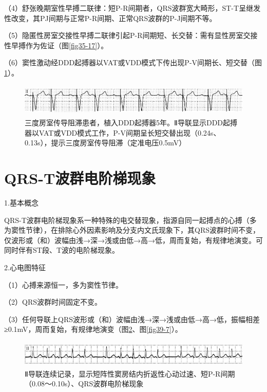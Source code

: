 （4）舒张晚期室性早搏二联律：短P-R间期者，QRS波群宽大畸形，ST-T呈继发性改变，其PJ间期与正常P-R间期、正常QRS波群的P-J间期不等。

（5）隐匿性房室交接性早搏二联律引起P-R间期短、长交替：需有显性房室交接性早搏作为佐证（图\ref{fig35-17}）。

（6）窦性激动经DDD起搏器以VAT或VDD模式下传出现P-V间期长、短交替（图\ref{fig39-5}）。

\begin{figure}[!htbp]
 \centering
 \includegraphics[width=5.58333in,height=0.61458in]{./images/Image00654.jpg}
 \captionsetup{justification=centering}
 \caption{三度房室传导阻滞患者，植入DDD起搏器5年。Ⅱ导联显示DDD起搏器以VAT或VDD模式工作，P-V间期呈长短交替出现（0.24s、0.13s），提示三度房室传导阻滞（定准电压0.5mV）}
 \label{fig39-5}
  \end{figure} 

\protect\hypertarget{text00046.htmlux5cux23subid517}{}{}

\section{QRS-T波群电阶梯现象}

1.基本概念

QRS-T波群电阶梯现象系一种特殊的电交替现象，指源自同一起搏点的心搏（多为窦性节律），在排除心外因素影响及分支内文氏现象下，其QRS波群时间不变，仅波形或（和）波幅由浅→深→浅或由低→高→低，周而复始，有规律地演变。可同时伴有ST段、T波的电阶梯现象。

2.心电图特征

（1）心搏来源恒一，多为窦性节律。

（2）QRS波群时间固定不变。

（3）任何导联上QRS波形或（和）波幅由浅→深→浅或由低→高→低，振幅相差≥0.1mV，周而复始，有规律地演变（图\ref{fig39-6}、图\ref{fig39-7}）。

\begin{figure}[!htbp]
 \centering
 \includegraphics[width=5.60417in,height=0.5in]{./images/Image00655.jpg}
 \captionsetup{justification=centering}
 \caption{Ⅱ导联连续记录，显示短阵性窦房结内折返性心动过速、短P-R间期（0.08～0.10s）、QRS波群电阶梯现象}
 \label{fig39-6}
  \end{figure} 

